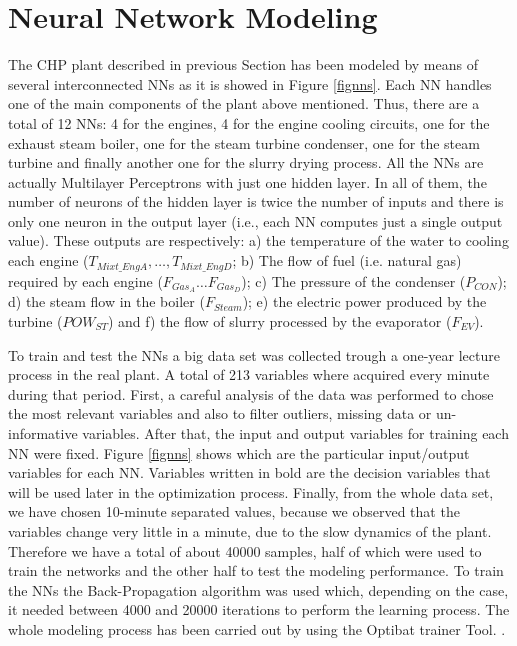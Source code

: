 \section{Neural Network Modeling}
\label{NN}

The CHP plant described in previous Section has been modeled by means of several interconnected NNs as it is showed in Figure \ref{fignns}. Each NN handles one of the main components of the plant above mentioned. Thus, there are a total of 12 NNs: 4 for the engines, 4 for the engine cooling  circuits, one for the exhaust steam boiler, one for the steam turbine condenser, one for the steam turbine and finally another one for the slurry drying process. All the NNs are actually Multilayer Perceptrons with just one hidden layer. In all of them, the number of neurons of the hidden layer is twice the number of inputs and there is only one neuron in the output layer (i.e., each NN computes just a single output value). These outputs are respectively: a) the temperature of the water to cooling each engine ($T_{Mixt\_EngA}, \dots, T_{Mixt\_EngD}$; b) The flow of fuel (i.e. natural gas) required by each engine ($F_{Gas_A} \dots F_{Gas_D}$); c) The pressure of the condenser ($P_{CON}$); d) the steam flow in the boiler ($F_{Steam}$); e) the electric power produced by the turbine ($POW_{ST}$) and f) the flow of slurry processed by the evaporator ($F_{EV}$). 

To train and test the NNs a big data set was collected trough a one-year lecture process in the real plant. A total of  213 variables where acquired every minute during that period. First, a careful analysis of the data was performed to chose the most relevant variables and also to filter outliers, missing data or un-informative variables. %
After that, the input and output variables for training each NN were fixed. Figure \ref{fignns} shows which are the particular input/output variables for each NN. Variables written in bold are the decision variables that will be used later in the optimization process. Finally, from the whole data set, we have chosen 10-minute separated values, because we observed that the variables change very little in a minute, due to the slow dynamics of the plant. Therefore we have a total of about \num{40000} samples, half of which were used to train the networks and the other half to test the modeling performance. To train the NNs the Back-Propagation algorithm was used which, depending on the case, it needed between \num{4000} and \num{20000} iterations to perform the learning process. %
The whole modeling process has been carried out by using the Optibat trainer Tool. .

